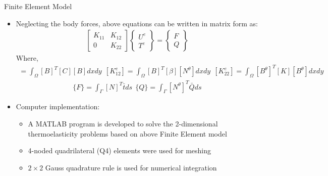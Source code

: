 \documentclass{beamer}
\begin{document}
\begin{frame}[t,fragile]{Finite Element Model}
    \vspace{-.3cm}
    \footnotesize
    \begin{itemize}
         \item Neglecting the body forces, above equations can be written in matrix form as: 
    \begin{align*}
\begin{bmatrix}
    K_{11} & K_{12} \\
    0 & K_{22}
\end{bmatrix}
\begin{Bmatrix}
    U^e\\ T^e
\end{Bmatrix}=
\begin{Bmatrix}
    F\\ Q
\end{Bmatrix}
\end{align*} 
Where,
\vspace{-.2cm}
    \scriptsize 
\begin{align*}
    [K_{11}^e]=\int_{\Omega}[B]^T[C][B]dxdy\ \
    [K_{12}^e]=\int_{\Omega}[B]^T[\beta][N^{\theta}]dxdy\ \
    [K_{22}^e]=\int_{\Omega}[B^{\theta}]^T[K][B^{\theta}]dxdy
\end{align*}
\vspace{-.5cm}
\begin{align*}
    \{F\}=\int_\Gamma [N]^T{\bar{t}}ds\ \
    \{Q\}=\int_\Gamma [N^{\theta}]^T\bar{Q}ds
\end{align*} \onslide<4->
\item \large{Computer implementation:}
    \begin{itemize}
\footnotesize
     \onslide<5->   \item A MATLAB program is developed to solve the 2-dimensional thermoelasticity problems based on above Finite Element model 
     \onslide<6->   \item 4-noded quadrilateral (Q4) elements were used for meshing 
      \onslide<7->  \item  $2\times 2$ Gauss quadrature rule is used for numerical integration
    \end{itemize}
\end{itemize}
\end{frame}
\end{document}
